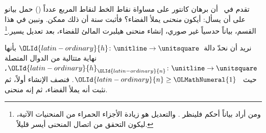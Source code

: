 \documentclass[../../../include/open-logic-section]{subfiles}
\begin{document}


تقدم في~ أن برهان كانتور على مساواة نقاط الخط لنقاط
المربع عدداً () حمل بيانو
على أن يسأل: أيكون \emph{منحنى} يملأ الفضاء؟ فأثبت سنة  أن ذلك ممكن.
ونبين في هذا القسم، بياناً حدسياً غير صوري، إنشاء منحنى هيلبرت المالئ
للفضاء، بعد تعديل يسير.\footnote{ومن أراد بياناً أحكم فلينظر
\cite{Rose2010}. والتعديل هو زيادة الأجزاء الحمراء من المنحنيات الآتية،
ليكون التحقق من اتصال المنحنى أيسر قليلاً.}

نريد أن نحدّ دالة~$\OLId{latin-ordinary}{h} \colon \unitline \to \unitsquare$ بأنها نهاية
متتالية من الدوال المتصلة $\OLId{latin-ordinary}{h}_\OLId{latin-ordinary}{n} \colon \unitline \to \unitsquare$، حيث
~$\OLId{latin-ordinary}{n} \geq \OLMathNumeral{1}$. فنصف الإنشاء أولاً، ثم نثبت أنه يملأ الفضاء، ثم إنه منحنى.
\end{document}
